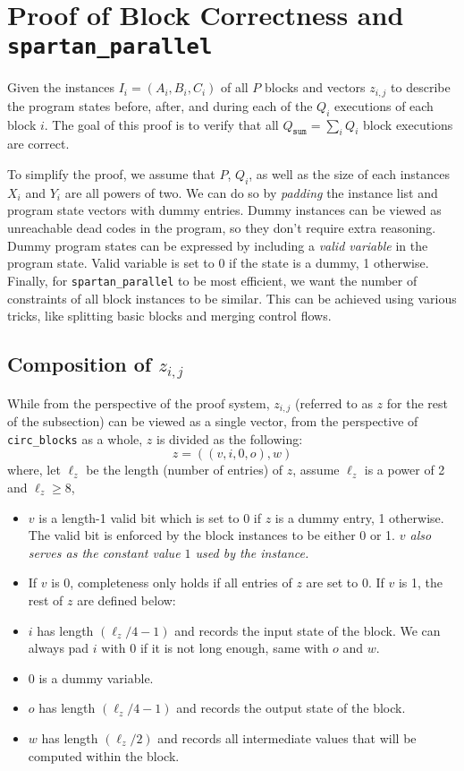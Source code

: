 \documentclass{article}
\newcommand{\code}{\texttt}
\newcommand{\Qsum}{Q_{\mathtt{sum}}}
\begin{document}

\section{Proof of Block Correctness and \code{spartan\_parallel}}\label{sec:block_correctness}

Given the instances $I_i = (A_i, B_i, C_i)$ of all $P$ blocks and vectors $z_{i, j}$ to describe the program states before, after, and during each of the $Q_i$ executions of each block $i$. The goal of this proof is to verify that all $\Qsum = \sum_i Q_i$ block executions are correct.

To simplify the proof, we assume that $P$, $Q_i$, as well as the size of each instances $X_i$ and $Y_i$ are all powers of two. We can do so by \emph{padding} the instance list and program state vectors with dummy entries. Dummy instances can be viewed as unreachable dead codes in the program, so they don't require extra reasoning. Dummy program states can be expressed by including a \emph{valid variable} in the program state. Valid variable is set to 0 if the state is a dummy, 1 otherwise. Finally, for \code{spartan\_parallel} to be most efficient, we want the number of constraints of all block instances to be similar. This can be achieved using various tricks, like splitting basic blocks and merging control flows.

\subsection{Composition of $z_{i, j}$}\label{io_composition}
While from the perspective of the proof system, $z_{i, j}$ (referred to as $z$ for the rest of the subsection) can be viewed as a single vector, from the perspective of \code{circ\_blocks} as a whole, $z$ is divided as the following:
$$z = ((v, i, 0, o), w)$$
where, let $\ell_z$ be the length (number of entries) of $z$, assume $\ell_z$ is a power of 2 and $\ell_z \geq 8$,
\begin{itemize}
    \item $v$ is a length-1 valid bit which is set to 0 if $z$ is a dummy entry, 1 otherwise. The valid bit is enforced by the block instances to be either 0 or 1. \emph{$v$ also serves as the constant value $1$ used by the instance.}
    \item If $v$ is 0, completeness only holds if all entries of $z$ are set to 0. If $v$ is 1, the rest of $z$ are defined below:
    \item $i$ has length $(\ell_z / 4 - 1)$ and records the input state of the block. We can always pad $i$ with 0 if it is not long enough, same with $o$ and $w$.
    \item $0$ is a dummy variable.
    \item $o$ has length $(\ell_z / 4 - 1)$ and records the output state of the block.
    \item $w$ has length $(\ell_z / 2)$ and records all intermediate values that will be computed within the block.
\end{itemize}
\end{document}
